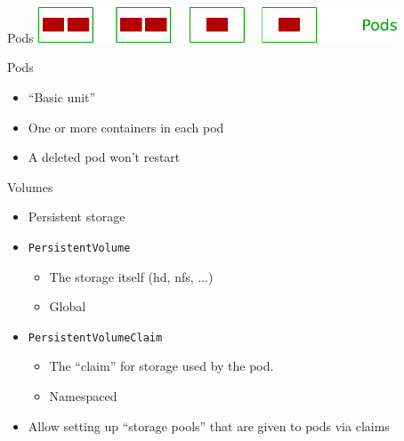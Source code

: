 \documentclass{dcpresentation}
\begin{document}
  \begin{frame}{Pods}
  \centering
  \includegraphics[width=0.8\textwidth]{img/arch-p.pdf}
 \end{frame}
 
 \begin{frame}{Pods}
  \begin{itemize}
   \item ``Basic unit''
   \item One or more containers in each pod
   \item A deleted pod won't restart
  \end{itemize}
 \end{frame}
 
 
 \begin{frame}{Volumes}
  \begin{itemize}
   \item Persistent storage
   \item \texttt{PersistentVolume}
   \begin{itemize}
    \item The storage itself (hd, nfs, ...)
    \item Global
   \end{itemize}
   \item \texttt{PersistentVolumeClaim}
   \begin{itemize}
    \item The ``claim'' for storage used by the pod.
    \item Namespaced
   \end{itemize}
   \item Allow setting up ``storage pools'' that are given to pods via claims
  \end{itemize}
 \end{frame}
\end{document}
